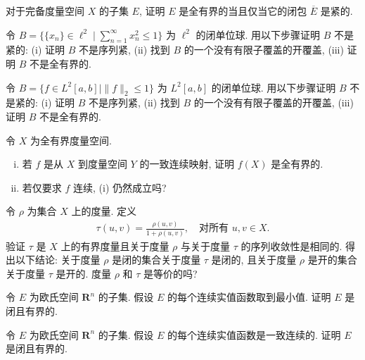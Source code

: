 \documentclass[../../main.tex]{subfiles}
\begin{document}
\begin{exercise}\label{exercise:ch09-62}
对于完备度量空间 $X$ 的子集 $E$, 证明 $E$ 是全有界的当且仅当它的闭包 $\overline{E}$ 是紧的.
\end{exercise}

\begin{exercise}\label{exercise:ch09-63}
令 $B=\{\{x_{n}\}\in\ell^{2}\mid\sum_{n=1}^{\infty}x_{n}^{2}\leqslant 1\}$ 为 $\ell^{2}$ 的闭单位球. 用以下步骤证明 $B$ 不是紧的: (i) 证明 $B$ 不是序列紧, (ii) 找到 $B$ 的一个没有有限子覆盖的开覆盖, (iii) 证明 $B$ 不是全有界的.
\end{exercise}

\begin{exercise}\label{exercise:ch09-64}
令 $B=\{f\in L^{2}[a,b]\mid\|f\|_{2}\leqslant 1\}$ 为 $L^{2}[a,b]$ 的闭单位球. 用以下步骤证明 $B$ 不是紧的: (i) 证明 $B$ 不是序列紧, (ii) 找到 $B$ 的一个没有有限子覆盖的开覆盖, (iii) 证明 $B$ 不是全有界的.
\end{exercise}

\begin{exercise}\label{exercise:ch09-65}
令 $X$ 为全有界度量空间.
\begin{enumerate}[(i)]
\item 若 $f$ 是从 $X$ 到度量空间 $Y$ 的一致连续映射, 证明 $f(X)$ 是全有界的.
\item 若仅要求 $f$ 连续, (i) 仍然成立吗?
\end{enumerate}
\end{exercise}

\begin{exercise}\label{exercise:ch09-66}
令 $\rho$ 为集合 $X$ 上的度量. 定义
\begin{align*}
\tau(u,v)=\frac{\rho(u,v)}{1+\rho(u,v)},\quad\text{对所有 }u,v\in X.
\end{align*}
验证 $\tau$ 是 $X$ 上的有界度量且关于度量 $\rho$ 与关于度量 $\tau$ 的序列收敛性是相同的. 得出以下结论: 关于度量 $\rho$ 是闭的集合关于度量 $\tau$ 是闭的, 且关于度量 $\rho$ 是开的集合关于度量 $\tau$ 是开的. 度量 $\rho$ 和 $\tau$ 是等价的吗?
\end{exercise}

\begin{exercise}\label{exercise:ch09-67}
令 $E$ 为欧氏空间 $\mathbf{R}^{n}$ 的子集. 假设 $E$ 的每个连续实值函数取到最小值. 证明 $E$ 是闭且有界的.
\end{exercise}

\begin{exercise}\label{exercise:ch09-68}
令 $E$ 为欧氏空间 $\mathbf{R}^{n}$ 的子集. 假设 $E$ 的每个连续实值函数是一致连续的. 证明 $E$ 是闭且有界的.
\end{exercise}
\end{document}

